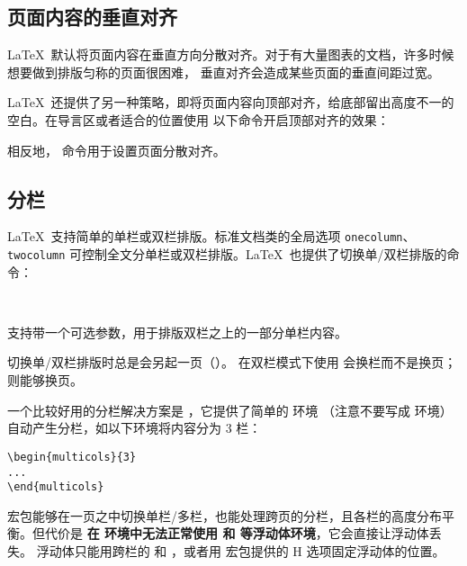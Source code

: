 \subsection{页面内容的垂直对齐}\label{subsec:raggedbottom}

\LaTeX\ 默认将页面内容在垂直方向分散对齐。对于有大量图表的文档，许多时候想要做到排版匀称的页面很困难，
垂直对齐会造成某些页面的垂直间距过宽。

\LaTeX\ 还提供了另一种策略，即将页面内容向顶部对齐，给底部留出高度不一的空白。在导言区或者适合的位置使用
以下命令开启顶部对齐的效果：
\begin{command}
\end{command}

相反地， 命令用于设置页面分散对齐。

\subsection{分栏}\label{subsec:columns}

\LaTeX\ 支持简单的单栏或双栏排版。标准文档类的全局选项 \texttt{onecolumn}、\texttt{twocolumn} 
可控制全文分单栏或双栏排版。\LaTeX\ 也提供了切换单/双栏排版的命令：
\begin{command}
 \\
\end{command}

 支持带一个可选参数，用于排版双栏之上的一部分单栏内容。

切换单/双栏排版时总是会另起一页（）。
在双栏模式下使用  会换栏而不是换页； 则能够换页。

一个比较好用的分栏解决方案是 ，它提供了简单的  环境
（注意不要写成  环境）自动产生分栏，如以下环境将内容分为 3 栏：
\begin{verbatim}
\begin{multicols}{3}
...
\end{multicols}
\end{verbatim}

 宏包能够在一页之中切换单栏/多栏，也能处理跨页的分栏，且各栏的高度分布平衡。但代价是%
\textbf{在  环境中无法正常使用  和  等浮动体环境}，它会直接让浮动体丢失。
浮动体只能用跨栏的  和  ，或者用  宏包提供的 H 选项固定浮动体的位置。

